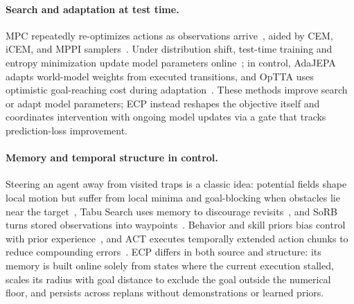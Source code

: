 \paragraph{Search and adaptation at test time.}
MPC repeatedly re-optimizes actions as observations arrive~\cite{garcia1989mpc}, aided by CEM, iCEM, and MPPI samplers~\cite{rubinstein1999cem,pinneri2021icem,williams2017mppi}. Under distribution shift, test-time training and entropy minimization update model parameters online~\cite{sun2020ttt,wang2021tent}; in control, AdaJEPA adapts world-model weights from executed transitions, and OpTTA uses optimistic goal-reaching cost during adaptation~\cite{wang2026adajepa,mete2026optta}. These methods improve search or adapt model parameters; ECP instead reshapes the objective itself and coordinates intervention with ongoing model updates via a gate that tracks prediction-loss improvement.

\paragraph{Memory and temporal structure in control.}
Steering an agent away from visited traps is a classic idea: potential fields shape local motion but suffer from local minima and goal-blocking when obstacles lie near the target~\cite{khatib1986potential,koren1991potential}, Tabu Search uses memory to discourage revisits~\cite{glover1989tabu}, and SoRB turns stored observations into waypoints~\cite{eysenbach2019sorb}. Behavior and skill priors bias control with prior experience~\cite{tirumala2022behaviorpriors,pertsch2021spirl}, and ACT executes temporally extended action chunks to reduce compounding errors~\cite{zhao2023act}. ECP differs in both source and structure: its memory is built online solely from states where the current execution stalled, scales its radius with goal distance to exclude the goal outside the numerical floor, and persists across replans without demonstrations or learned priors.
